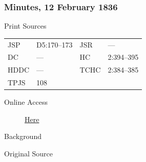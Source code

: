 		\subsubsection{Minutes, 12 February 1836}
			\label{EMS-1836-JS-12-FEB-1836}
			
			\begin{description}
					\item[Print Sources]
				\end{description}

					\begin{tabular}{p{0.5in}p{1in}p{0.5in}p{1in}}
					JSP	 	& D5:170--173		& JSR 		& --- \\
					DC	 	& ---				& HC 		& 2:394--395 \\
					HDDC 	& ---				& TCHC 		& 2:384--385 \\
					TPJS 	& 108				& 	 		&  \\
					\end{tabular}
				
				\begin{description}
					\item[Online Access] \href{https://www.josephsmithpapers.org/paper-summary/minutes-12-february-1836/1}{Here}
				\end{description}
				
				\begin{description}
					\item[Background]
				\end{description}
				
				
				\begin{description}
					\item[Original Source]
				\end{description}
				
				

